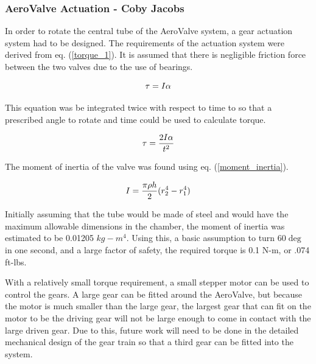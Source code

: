 \subsubsection{AeroValve Actuation - Coby Jacobs}

In order to rotate the central tube of the AeroValve system, a gear actuation system had to be designed. The requirements of the actuation system were derived from eq. (\ref{torque_1}). It is assumed that there is negligible friction force between the two valves due to the use of bearings.

\begin{equation}
\centering   
\tau=I\alpha
\label{torque_1}
\end{equation}

This equation was be integrated twice with respect to time to so that a prescribed angle to rotate and time could be used to calculate torque.

\begin{equation}
\centering   
\tau=\frac{2I\alpha}{t^2}
\end{equation}

The moment of inertia of the valve was found using eq. (\ref{moment_inertia}).

\begin{equation}
    \centering
    I = \frac{\pi\rho h}{2}(r_2^4-r_1^4)
    \label{moment_inertia}
\end{equation}

Initially assuming that the tube would be made of steel and would have the maximum allowable dimensions in the chamber, the moment of inertia was estimated to be 0.01205 $kg-m^4$. Using this, a basic assumption to turn $60\deg$ in one second, and a large factor of safety, the required torque is 0.1 N-m, or .074 ft-lbs.

With a relatively small torque requirement, a small stepper motor can be used to control the gears. A large gear can be fitted around the AeroValve, but because the motor is much smaller than the large gear, the largest gear that can fit on the motor to be the driving gear will not be large enough to come in contact with the large driven gear. Due to this, future work will need to be done in the detailed mechanical design of the gear train so that a third gear can be fitted into the system.

